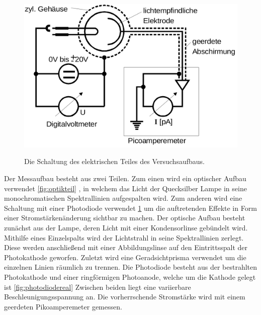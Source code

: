 \begin{figure}
	\centering
	\caption{Die Schaltung des elektrischen Teiles des Versuchsaufbaus.}
	\includegraphics[width=\linewidth-150pt,height=\textheight-150pt,keepaspectratio]{content/Bilder/Elektrikteil.png}
	\label{fig:elektrikteil}
\end{figure}





Der Messaufbau besteht aus zwei Teilen. Zum einen wird ein optischer Aufbau verwendet \ref{fig:optikteil} ,
in welchem das Licht der Quecksilber Lampe in seine monochromatischen Spektrallinien
aufgespalten wird. Zum anderen wird eine Schaltung mit einer Photodiode verwendet \ref{fig:elektrikteil} um die auftretenden
Effekte in Form einer Stromstärkenänderung sichtbar zu machen. Der optische Aufbau
besteht zunächst aus der Lampe, deren Licht mit einer Kondensorlinse gebündelt wird.
 Mithilfe eines Einzelspalts wird der Lichtstrahl in seine Spektrallinien zerlegt.
 Diese werden anschließend mit einer Abbildungslinse auf den Eintrittsspalt der
 Photokathode geworfen. Zuletzt wird eine Geradsichtprisma verwendet um die
 einzelnen Linien räumlich zu trennen. Die Photodiode besteht aus der bestrahlten
 Photokathode und einer ringförmigen Photoanode, welche um die Kathode gelegt ist \ref{fig:photodiodereal}
 Zwischen beiden liegt eine variierbare Beschleunigungsspannung an. Die vorherrschende
 Stromstärke wird mit einem geerdeten Pikoamperemeter gemessen.
